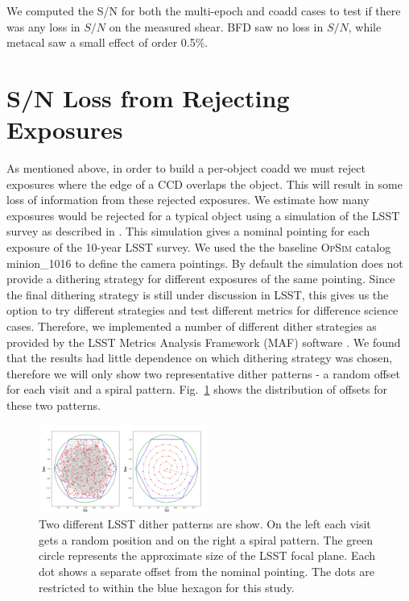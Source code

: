 \documentclass[fleqn,useAMS,usenatbib]{mnras}
\begin{document}
We computed the S/N for both the multi-epoch and coadd cases to test if there was any loss in $S/N$ on the measured shear.  BFD saw no loss in $S/N$, while metacal saw a small effect of order 0.5$\%$.

\section{S/N Loss from Rejecting Exposures}
\label{Section:Exclusion}
As mentioned above, in order to build a per-object coadd we must reject exposures where the edge of a CCD overlaps the object.  This will result in some loss of information from these rejected exposures.  We estimate how many exposures would be rejected for a typical object using a simulation of the LSST survey as described in \cite{LSSTSims}.  This simulation gives a nominal pointing for each exposure of the 10-year LSST survey.  We used the the baseline \textsc{OpSim} catalog \textsf{minion\_1016} to define the camera pointings.  By default the simulation does not provide a dithering strategy for different exposures of the same pointing.  Since the final dithering strategy is still under discussion in LSST, this gives us the option to try different strategies and test different metrics for difference science cases.  Therefore, we implemented a number of different dither strategies as provided by the LSST Metrics Analysis Framework (MAF) software \citep{LSSTSims}.  We found that the results had little dependence on which dithering strategy was chosen, therefore we will only show two representative dither patterns - a random offset for each visit and a spiral pattern. Fig.~\ref{fig:dither} shows the distribution of offsets for these two patterns.

\begin{figure}
    \includegraphics[width=0.5\textwidth]{Dither.png}
    \caption{
   Two different LSST dither patterns are show.  On the left each visit gets a random position and on the right a spiral pattern.  The green circle represents the approximate size of the LSST focal plane.  Each dot shows a separate offset from the nominal pointing.  The dots are restricted to within the blue hexagon for this study.
    }
    \label{fig:dither}
\end{figure}
\end{document}
